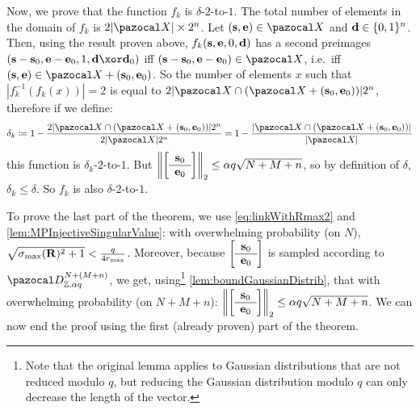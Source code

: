 {\begin{proofE}
    Now, we prove that the function $f_k$ is $\delta$-$2$-to-$1$. The total number of elements in the domain of $f_k$ is $2|\ccX| \times 2^n$. Let $(\vect{s},\vect{e}) \in \ccX$ and $\mathbf{d} \in \{0,1\}^n$. Then, using the result proven above, $f_k(\mathbf{s},\mathbf{e},0,\mathbf{d})$ has a second preimages $(\vect{s}-\vect{s}_0, \vect{e}-\vect{e}_0,1,\vect{d} \xor \vect{d}_0)$ iff $(\vect{s}-\vect{s}_0,\vect{e}-\vect{e}_0) \in \ccX$, i.e.\ iff $(\vect{s},\vect{e}) \in \ccX + (\vect{s}_0,\vect{e}_0)$. So the number of elements $x$ such that $|f_k^{-1}(f_k(x))|=2$ is equal to $2 |\ccX \cap (\ccX + (\vect{s}_0,\vect{e}_0))| 2^n$, therefore if we define:
    \begin{align}
      \delta_k \eqdef 1-\frac{2 |\ccX \cap (\ccX + (\vect{s}_0,\vect{e}_0))| 2^n}{2 |\ccX| 2^n} = 1-\frac{|\ccX \cap (\ccX + (\vect{s}_0,\vect{e}_0))|}{|\ccX|}
    \end{align}
    this function is $\delta_k$-$2$-to-$1$. But $\left\|\SmallBlockMatrix{\vect{s}_0}{\vect{e}_0}\right\|_2 \leq \alpha q \sqrt{N + M + n}$, so by definition of $\delta$, $\delta_k \leq \delta$. So $f_k$ is also $\delta$-$2$-to-$1$.

    To prove the last part of the theorem, we use \cref{eq:linkWithRmax2} and \cref{lem:MPInjectiveSingularValue}: with overwhelming probability (on $N$), $\sqrt{\sigma_{\max}(\mathbf{R})^2 +1 } < \frac{q}{4 r_{\max}}$. Moreover, because $\SmallBlockMatrix{\vect{s}_0}{\vect{e}_0}$ is sampled according to $\disGauss{\alpha}{q}^{N+(M+n)}$, we get, using\footnote{Note that the original lemma applies to Gaussian distributions that are not reduced modulo $q$, but reducing the Gaussian distribution modulo $q$ can only decrease the length of the vector.} \cref{lem:boundGaussianDistrib}, that with overwhelming probability (on $N+M+n$): $\left\|\SmallBlockMatrix{\vect{s}_0}{\vect{e}_0}\right\|_2 \leq \alpha q \sqrt{N+M+n}$. We can now end the proof using the first (already proven) part of the theorem.
  \end{proofE}

}
